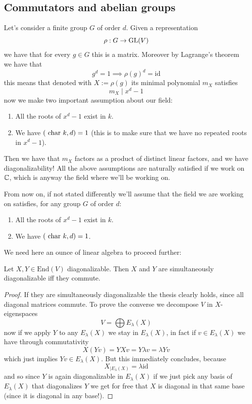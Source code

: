 \documentclass[11pt]{scrartcl}
\begin{document}
	\subsection{Commutators and abelian groups}
	
	Let's consider a finite group $G$ of order $d$. Given a representation
	$$\rho : G \to \operatorname{GL}(V)$$
	we have that for every $g\in G$ this is a matrix. Moreover by Lagrange's theorem we have that
	$$g^d=1 \implies \rho(g)^d = \text{id}$$
	this means that denoted with $X:= \rho(g)$ its minimal polynomial $m_X$ satisfies
	$$m_X \mid x^d-1$$
	now we make two important assumption about our field:
	\begin{enumerate}
		\item All the roots of $x^d-1$ exist in $k$.
		\item We have $(\text{ char } k, d)=1$ (this is to make sure that we have no repeated roots in $x^d-1$).
	\end{enumerate}
	Then we have that $m_X$ factors as a product of distinct linear factors, and we have diagonalizability! All the above assumptions are naturally satisfied if we work on $\mathbb C$, which is anyway the field where we'll be working on.
	\begin{assume*}
		From now on, if not stated differently we'll assume that the field we are working on satisfies, for any group $G$ of order $d$:
		\begin{enumerate}
			\item All the roots of $x^d-1$ exist in $k$.
			\item We have $(\text{ char } k, d)=1$.
		\end{enumerate}
	\end{assume*}
	We need here an ounce of linear algebra to proceed further:
	\begin{proposition}
		Let $X,Y\in \text{End}(V)$ diagonalizable. Then $X$ and $Y$ are simultaneously diagonalizable iff they commute.
	\end{proposition}
	\begin{proof}
		If they are simultaneously diagonalizable the thesis clearly holds, since all diagonal matrices commute. To prove the converse we decompose $V$ in $X$-eigenspaces
		$$V=\bigoplus E_\lambda(X)$$
		now if we apply $Y$ to any $E_\lambda(X)$ we stay in $E_\lambda(X)$, in fact if $v\in E_\lambda(X)$ we have through commutativity
		$$X(Yv)=YXv=Y\lambda v= \lambda Yv$$
		which just implies $Yv\in E_\lambda(X)$. But this immediately concludes, because 
		$$X_{\mid E_\lambda(X)}=\lambda\text{id}$$
		and so since $Y$ is again diagonalizable in $E_\lambda(X)$ if we just pick any basis of $E_\lambda(X)$ that diagonalizes $Y$ we get for free that $X$ is diagonal in that same base (since it is diagonal in any base!). 
	\end{proof}
\end{document}
